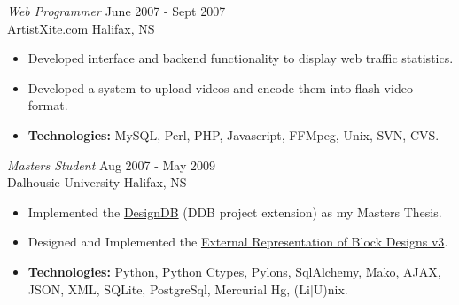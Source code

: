\documentclass[line,margin]{res}
\begin{document}
\begin{resume}
   {\sl Web Programmer} \hfill June 2007 - Sept 2007 \\
    ArtistXite.com \hfill Halifax, NS \smallskip
    \begin{itemize}  \itemsep -2pt %
     \item Developed interface and backend functionality to display
               web traffic statistics.
     \item Developed a system to upload videos and encode them
                into flash video format.
     \item {\bf Technologies:}\hspace{4pt}
        MySQL, Perl, PHP, Javascript, FFMpeg, Unix, SVN, CVS.
    \end{itemize}

   {\sl Masters Student} \hfill Aug 2007 - May 2009 \\
     Dalhousie University \hfill Halifax, NS \smallskip
      \begin{itemize}  \itemsep -2pt %
       \item Implemented the
       \href{http://batman.cs.dal.ca/~peter/designdb/}{DesignDB} (DDB
       project extension) as my Masters Thesis.
       \item Designed and Implemented the
       \href{http://designtheory.org/library/extrep/}{External
       Representation of Block Designs v3}.
       \item {\bf Technologies:} \hspace{1pt}
        Python, Python Ctypes, Pylons, SqlAlchemy, Mako, AJAX, \newline
        \hspace*{72pt} JSON, XML, SQLite, PostgreSql, Mercurial Hg,
        (Li$|$U)nix.
    \end{itemize}

\newpage
\opening
\addvspace{\sectionskip}



\end{resume}
\end{document}
